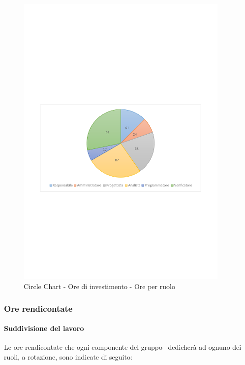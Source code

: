 \documentclass[../PianoProgetto.tex]{subfiles}
\begin{document}
	\begin{figure}[!h]
		\centering
		\includegraphics[width=0.93\textwidth , trim=2cm 9.5cm 2cm 11cm]{grafici/Riepilogo/Investimento/ore-ruolo}
			\caption{Circle Chart - Ore di investimento - Ore per ruolo}
		\label{fig:CircleChart-investimento_ore_r}
	\end{figure}
\vfill	
	\subsubsection{Ore rendicontate}
				\paragraph{Suddivisione del lavoro}
					Le ore rendicontate che ogni componente del gruppo \leaf\ dedicherà ad ognuno dei ruoli, a rotazione, sono indicate di seguito:
	
\end{document}
